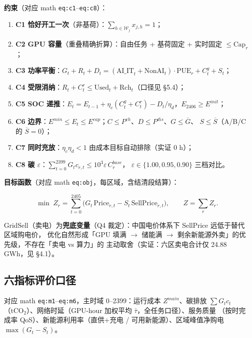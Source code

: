 \documentclass{internal-report}
\begin{document}
\textbf{约束}（对应 math \texttt{eq:c1}--\texttt{eq:c8}）：
\begin{enumerate}
  \item \textbf{C1 恰好开工一次}（非基荷）：$\sum_{h\in\mathcal{W}_j} x_{j,h}=1$；
  \item \textbf{C2 GPU 容量}（重叠精确折算）：自由任务 + 基荷固定 + 实时固定 $\le \text{Cap}_r$；
  \item \textbf{C3 功率平衡}：$G_t+R_t+D_t = (\text{AI\_IT}_t+\text{NonAI}_t)\cdot\text{PUE}_r + C^g_t + S_t$；
  \item \textbf{C4 受限消纳}：$R_t + C^r_t \le \text{Used}_t + \text{Rch}_t$（口径见 §5.4）；
  \item \textbf{C5 SOC 递推}：$E_t = E_{t-1} + \eta_c(C^g_t+C^r_t) - D_t/\eta_d$，$E_{2406}\ge E^{init}$；
  \item \textbf{C6 边界}：$E^{min}\le E_t\le E^{cap}$；$C\le P^{ch}$、$D\le P^{dis}$、$G\le\overline{G}$、
        $S\le\overline{S}$（A/B/C 的 $\overline{S}=0$）；
  \item \textbf{C7 同时充放}：$\eta_c\eta_d<1$ 由成本目标自动排除（实证 0 h）；
  \item \textbf{C8 碳 $\varepsilon$}：$\sum_{t=0}^{2399} G_t c_{r,t} \le 10^3\varepsilon\,C^{base}_r$，
        $\varepsilon\in\{1.00,0.95,0.90\}$ 三档对比。
\end{enumerate}

\textbf{目标函数}（对应 math \texttt{eq:obj}，每区域，含结清段结算）：

\begin{equation}
  \min\; Z_r = \sum_{t=0}^{2405}\big( G_t\,\text{Price}_{r,t} - S_t\,\text{SellPrice}_{r,t} \big),
  \qquad Z = \sum_r Z_r.
  \label{eq:obj}
\end{equation}

GridSell（卖电）为\textbf{兜底变量}（Q4 裁定）：中国电价体系下 SellPrice 远低于替代区域购电价，
优化自然形成「GPU 填满 $\to$ 储能满 $\to$ 剩余新能源外卖」的优先级，不存在「卖电 vs 算力」的
主动取舍（实证：六区卖电合计仅 24.88 GWh，见 §4.1）。

\subsection{六指标评价口径}
\label{sec:six}

对应 math \texttt{eq:m1}--\texttt{eq:m6}，主时域 0--2399：运行成本 $Z^{main}$、碳排放
$\sum G_t c_t$（tCO$_2$）、网络时延（GPU-hour 加权平均 $\bar\tau$，全任务口径）、服务质量
（按时完成率 QoS）、新能源利用率（直供+充电 / 可用新能源）、区域峰值净购电 $\max(G_t-S_t)$。
\end{document}
